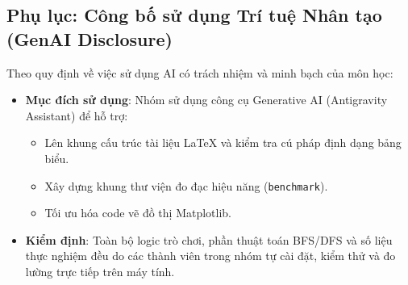 \documentclass[12pt,a4paper]{article}
\begin{document}
\subsection{Phụ lục: Công bố sử dụng Trí tuệ Nhân tạo (GenAI Disclosure)}
Theo quy định về việc sử dụng AI có trách nhiệm và minh bạch của môn học:
\begin{itemize}
    \item \textbf{Mục đích sử dụng}: Nhóm sử dụng công cụ Generative AI (Antigravity Assistant) để hỗ trợ:
    \begin{itemize}
        \item Lên khung cấu trúc tài liệu LaTeX và kiểm tra cú pháp định dạng bảng biểu.
        \item Xây dựng khung thư viện đo đạc hiệu năng (\texttt{benchmark}).
        \item Tối ưu hóa code vẽ đồ thị Matplotlib.
    \end{itemize}
    \item \textbf{Kiểm định}: Toàn bộ logic trò chơi, phần thuật toán BFS/DFS và số liệu thực nghiệm đều do các thành viên trong nhóm tự cài đặt, kiểm thử và đo lường trực tiếp trên máy tính.
\end{itemize}


\end{document}
